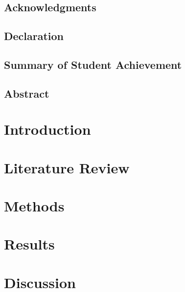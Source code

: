 \documentclass[12pt]{report}
\begin{document}

\restoregeometry

\section*{Acknowledgments}

\pagebreak

\section*{Declaration}

\pagebreak

\section*{Summary of Student Achievement}

\pagebreak

\setcounter{tocdepth}{5}
\tableofcontents
\pagebreak

\listoffigures
\listoftables
\pagebreak

\justify

\section*{Abstract}

\pagebreak
\printglossaries

\chapter{Introduction}


\chapter{Literature Review}


\chapter{Methods}


\chapter{Results}


\chapter{Discussion}

\end{document}

